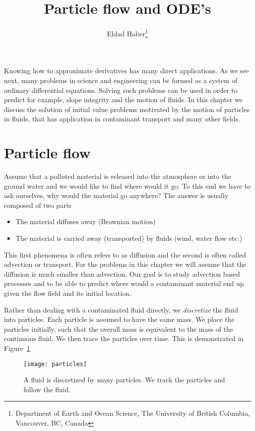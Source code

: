 \documentclass[12pt,legal]{article}
\begin{document}
\title{Particle flow and ODE's}
\author{Eldad Haber\thanks{Department of Earth and Ocean Science, The University of British Columbia, Vancouver, BC, Canada}}

\maketitle


Knowing how to approximate derivatives has many direct applications. As we see next,
many problems in science and engineering can be formed as a system of ordinary differential equations. Solving such problems can be used in order to predict for example, slope integrity and the motion of fluids. In this chapter we discuss the solution of initial value problems motivated by the motion of particles in fluids, that has application in contaminant transport and many other fields.

\section{Particle flow}

Assume that a polluted material is released into the atmosphere or into the ground water and we would like to find where would it go.
To this end we have to ask ourselves, why would the material go anywhere?
The answer is usually composed of two parts
\begin{itemize}
\item The material diffuses away (Brownian motion)
\item The material is carried away (transported) by fluids (wind, water flow etc.) 
\end{itemize}

This first phenomena is often refers to as diffusion and the second is often called advection or transport. For the problems in this chapter we will assume that the diffusion is much smaller than advection. Our goal is to study advection based processes and to be able to predict where would a contaminant material end up given the flow field and its initial location.  

\bigskip 

Rather than dealing with a contaminated fluid directly, we {\em discretize} the fluid into particles. Each particle is assumed to have the same mass. We place the particles initially, such that the overall mass is equivalent to the mass of the continuous fluid. We then trace the particles over time. This is demonstrated in Figure~\ref{particles}
\begin{figure}
\begin{center}
\texttt{[image: particles]}
\caption{A fluid is discretized by many particles. We track the particles and follow the fluid. \label{particles}}
\end{center}
\end{figure}
\end{document}
